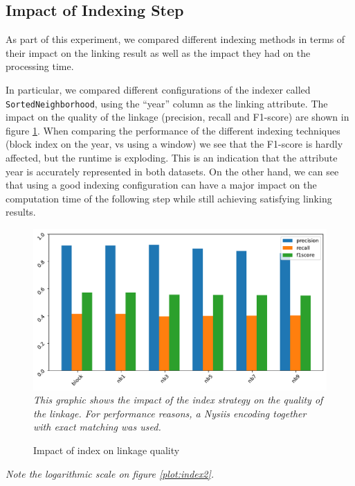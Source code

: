 \documentclass[sigconf,nonacm]{acmart}
\begin{document}
\subsection{Impact of Indexing Step}

As part of this experiment, we compared different indexing methods
in terms of their impact on the linking result as well as the impact
they had on the processing time.

In particular, we compared different configurations of the indexer
called
\texttt{SortedNeighborhood}, using the ``year'' column
as the linking attribute. The impact on the quality of the
linkage (precision, recall and F1-score) are shown in figure \ref{plot:index}.
When comparing the performance of the different indexing techniques
(block index on the year, vs using a window) we see that the F1-score is hardly
affected, but the runtime is exploding.
This is an indication that the attribute year is accurately represented
in both datasets.
On the other hand, we can see that using a good indexing configuration
can have a major impact on the computation time of the following step
while still achieving satisfying linking results.

\begin{figure}
\centering
\caption{Impact of index on linkage quality}
\label{plot:index}
\includegraphics[width=0.9\linewidth]{../figures/eval_indexing}\\[-2mm]
\emph{\small This graphic shows the impact of the index strategy on the quality
of the linkage.
For performance reasons, a
Nysiis encoding together with exact matching was used.}
\end{figure}

\emph{Note the logarithmic scale on figure \ref{plot:index2}.}
\end{document}
